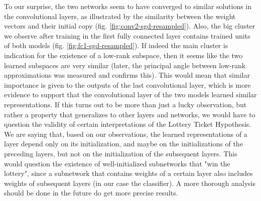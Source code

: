 To our surprise, the two networks seem to have converged to similar solutions in the convolutional layers, as illustrated by the similarity between the weight vectors and their initial copy (fig. \ref{fig:conv2-sgd-resampled}). Also, the big cluster we observe after training in the first fully connected layer contains trained units of both models (fig. \ref{fig:fc1-sgd-resampled}). If indeed the main cluster is indication for the existence of a low-rank subspace, then it seems like the two learned subspaces are very similar (later, the principal angle between low-rank approximations was measured and confirms this). This would mean that similar importance is given to the outputs of the last convolutional layer, which is more evidence to support that the convolutional layer of the two models learned similar representations. If this turns out to be more than just a lucky observation, but rather a property that generalizes to other layers and networks, we would have to question the validity of certain interpretations of the Lottery Ticket Hypothesis. We are saying that, based on our observations, the learned representations of a layer depend only on its initialization, and maybe on the initializations of the preceding layers, but not on the initialization of the subsequent layers. This would question the existence of well-initialized subnetworks that "win the lottery", since a subnetwork that contains weights of a certain layer also includes weights of subsequent layers (in our case the classifier). A more thorough analysis should be done in the future do get more precise results.


